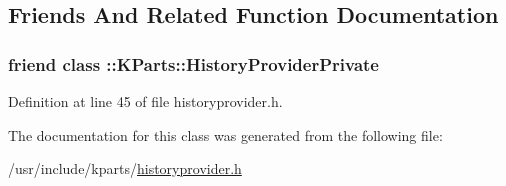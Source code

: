 \subsection{Friends And Related Function Documentation}
\hypertarget{classKParts_1_1HistoryProvider_aa6bf68e5e8d7a54d38811147d3243489}{
\subsubsection[{\+::\+K\+Parts\+::\+History\+Provider\+Private}]{\setlength{\rightskip}{0pt plus 5cm}friend class \+::K\+Parts\+::\+History\+Provider\+Private\hspace{0.3cm}{\ttfamily [friend]}}}\label{classKParts_1_1HistoryProvider_aa6bf68e5e8d7a54d38811147d3243489}


Definition at line 45 of file historyprovider.\+h.



The documentation for this class was generated from the following file\+:\begin{DoxyCompactItemize}
\item 
/usr/include/kparts/\hyperlink{historyprovider_8h}{historyprovider.\+h}\end{DoxyCompactItemize}
